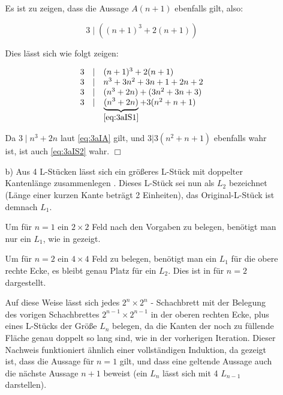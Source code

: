 \documentclass[a4paper,10pt]{scrartcl}
\begin{document}
\begin{enumerate}
\begin{enumerate}
                Es ist zu zeigen, dass die Aussage $A(n + 1)$ ebenfalls gilt, also:

                \begin{equation}\label{eq:3aIS1}
                    3 \mid \left((n+1)^3 + 2(n+1)\right)
                \end{equation}

                Dies lässt sich wie folgt zeigen:

                \begin{equation}\begin{array}{rcl}\label{eq:3aIS2}
                    3 &\mid& (n+1)^3 + 2(n+1)\\
                    3 &\mid& n^3 + 3n^2 + 3n +1 + 2n + 2\\
                    3 &\mid& (n^3 + 2n) + (3n^2  + 3n + 3)\\
                    3 &\mid& \underbrace{(n^3 + 2n)}_{\eqref{eq:3aIS1}} + 3 (n^2  + n + 1)
                \end{array}\end{equation}

                Da $3 \mid n^3 + 2n$ laut \eqref{eq:3aIA} gilt, und $3 | 3(n^2 + n + 1)$ ebenfalls
                wahr ist, ist auch \eqref{eq:3aIS2} wahr. $\Box$

            \item[b)]
                Aus 4 L-Stücken lässt sich ein größeres L-Stück mit doppelter Kantenlänge zusammenlegen .
                Dieses L-Stück sei nun als $L_2$ bezeichnet (Länge einer kurzen Kante beträgt 2 Einheiten), das
                Original-L-Stück ist demnach $L_1$.

                Um für $n = 1$ ein $2 \times 2$ Feld nach den Vorgaben zu belegen, benötigt man nur ein $L_1$,
                wie in  gezeigt.

                Um für $n = 2$ ein $4 \times 4$ Feld zu belegen, benötigt man ein $L_1$ für die obere rechte
                Ecke, es bleibt genau Platz für ein $L_2$. Dies ist in  für $n = 2$ dargestellt.

                Auf diese Weise lässt sich jedes $2^n \times 2^n$ - Schachbrett mit der Belegung des vorigen Schachbrettes
                $2^{n-1} \times 2^{n-1}$ in der oberen rechten Ecke, plus eines L-Stücks der Größe $L_n$ belegen, da die Kanten
                der noch zu füllende Fläche genau doppelt so lang sind, wie in der vorherigen
                Iteration. Dieser Nachweis funktioniert ähnlich einer vollständigen Induktion,
                da gezeigt ist, dass die Aussage für $n = 1$ gilt, und dass eine geltende
                Aussage auch die nächste Aussage $n + 1$ beweist (ein $L_n$ lässt sich mit 4
                $L_{n-1}$ darstellen).


\end{enumerate}
\end{enumerate}
\end{document}
